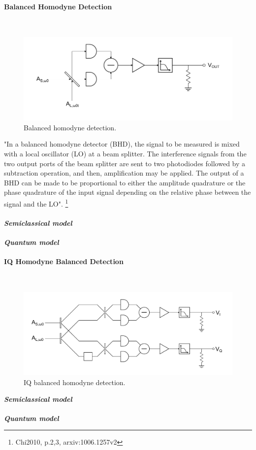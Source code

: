 \begin{bibunit}[plain]
\paragraph{Balanced Homodyne Detection}\ \\
\begin{figure}[H]
	\centering
	\includegraphics{./sdf/optical_detection/figures/detection-balanced-homodyne.pdf}
	\caption{Balanced homodyne detection.}
\end{figure}
"In a balanced homodyne detector (BHD), the signal to be measured is mixed with a local oscillator (LO) at a beam splitter. The interference signals from the two output ports of the beam splitter are sent to two photodiodes followed by a subtraction operation, and then, amplification may be applied. The output of a BHD can be made to be proportional to either the amplitude quadrature or the phase quadrature of the input signal depending on the relative phase between the signal and the LO".
\footnote{Chi2010, p.2,3, arxiv:1006.1257v2}
\\
\\
{\bf \em Semiclassical model}\\
\\
{\bf \em Quantum model}\\

\paragraph{IQ Homodyne Balanced Detection}\ \\
\begin{figure}[H]
	\centering
	\includegraphics[width=15cm]{./sdf/optical_detection/figures/detection-IQ-balanced-homodyne.pdf}
	\caption{IQ balanced homodyne detection.}
\end{figure}
\noindent
{\bf \em Semiclassical model}\\
\\
{\bf \em Quantum model}\\



\end{bibunit}
